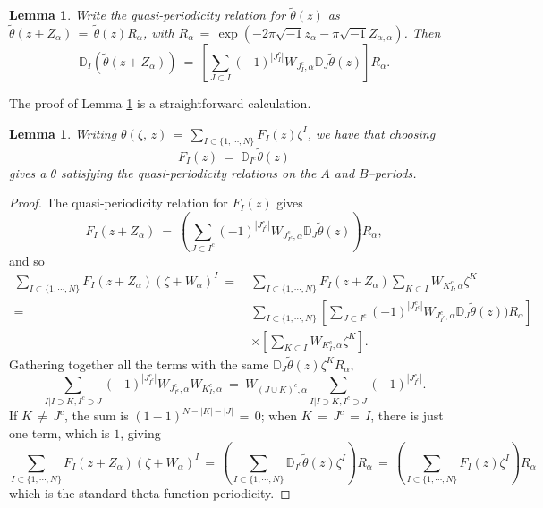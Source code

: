 \documentclass[12pt,reqno]{amsart}
\numberwithin{equation}{section}
\newtheorem{lemma}[theorem]{Lemma}
\theoremstyle{definition}
\theoremstyle{remark}
\def\bD{{\mathbb {D}}}
\def\bD{{\mathbb {D}}}
\begin{document}
\begin{lemma}\label{lem2}
Write the quasi-periodicity relation for $\widetilde{\theta} (z)$ as $\widetilde{\theta}(z+Z_\alpha)\, =\,
\widetilde{\theta}(z) R_\alpha$, with $R_\alpha \,=\, \exp (-2\pi\sqrt{-1} z_\alpha -\pi\sqrt{-1} Z_{\alpha,\alpha})$.
Then  
$$\bD_I(\widetilde{\theta}(z+Z_\alpha))\ =\ [\sum_{J\subset I}(-1)^{|J^c_I|} W_{J_I^c,\alpha} \bD_J\widetilde{\theta}
(z) ]R_\alpha .$$
\end{lemma}

The proof of Lemma \ref{lem2} is a straightforward calculation. 

\begin{lemma}\label{lem3}
Writing $\theta(\zeta,\, z) \,=\, \sum_{I\subset\{1,\cdots ,N\}} F_I(z) \zeta^I$, we have that choosing
$$F_I(z)\ = \  \bD_{I^c}\widetilde{\theta}(z)  $$
gives a $\theta$ satisfying the quasi-periodicity relations on the $A$ and $B$--periods.
\end{lemma}

\begin{proof}The quasi-periodicity relation for $F_I(z)$
gives
$$F_I(z+Z_\alpha)\ =\ (\sum_{J\subset I^c}(-1)^{|J_{I^c}^c|} W_{J_{I^c}^c,\alpha} \bD_J\widetilde{\theta}(z) )
R_\alpha ,$$
and so 
\begin{align}\nonumber
\sum_{I\subset\{1,\cdots ,N\}} F_I(z+Z_\alpha) (\zeta+W_\alpha)^I\ =\ &
\sum_{I\subset\{1,\cdots ,N\}} F_I(z+Z_\alpha)\sum _{K\subset I}  W_{K_I^c,\alpha}\zeta^K \nonumber\\
=\ &\sum_{I\subset\{1,\cdots,N\}} [\sum_{J\subset I^c}(-1)^{|J_{I^c}^c|} W_{J_{I^c}^c,\alpha} \bD_J
\widetilde{\theta}(z) )R_\alpha]\nonumber\\&
\times [ \sum _{K\subset I} W_{K_I^c,\alpha}\zeta^K].\nonumber
\end{align} 
Gathering together all the terms with the same $\bD_J\widetilde{\theta}(z) \zeta^K R_\alpha$,
 $$ \sum_{I| I\supset K, I^c\supset J} (-1)^{|J_{I^c}^c|}W_{J_{I^c}^c,\alpha}W_{K_I^c,\alpha}
\ =\ W_{(J\cup K)^c,\alpha }\sum_{I| I\supset K, I^c\supset J} (-1)^{|J_{I^c}^c|}.$$
If $K\,\neq\, J^c$, the sum is $(1-1)^{N-|K|-|J|} \, =\, 0$; when $K\,=\,J^c\, =\, I$, there is just one term,
which is $1$, giving 
$$\sum_{I\subset\{1,\cdots ,N\}} F_I(z+Z_\alpha) (\zeta+W_\alpha)^I\, =\, 
(\sum_{I\subset\{1,\cdots,N\}}\bD_{I^c}\widetilde{\theta}
(z)\zeta^I)R_\alpha\, =\, (\sum_{I\subset\{1,\cdots,N\}} F_I(z) \zeta^I)R_\alpha$$
which is the standard theta-function periodicity.
\end{proof}
\end{document}
